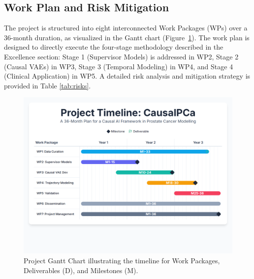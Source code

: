 \documentclass[11pt, a4paper]{article}
\begin{document}
\subsection{Work Plan and Risk Mitigation}
The project is structured into eight interconnected Work Packages (WPs) over a 36-month duration, as visualized in the Gantt chart (Figure~\ref{fig:gantt}). The work plan is designed to directly execute the four-stage methodology described in the Excellence section: Stage 1 (Supervisor Models) is addressed in WP2, Stage 2 (Causal VAEs) in WP3, Stage 3 (Temporal Modeling) in WP4, and Stage 4 (Clinical Application) in WP5. A detailed risk analysis and mitigation strategy is provided in Table \ref{tab:risks}.

\begin{figure}[H]
    \centering
    \includegraphics[width=\textwidth]{gantt.png}
    \caption{Project Gantt Chart illustrating the timeline for Work Packages, Deliverables (D), and Milestones (M).}
    \label{fig:gantt}
\end{figure}
\end{document}
